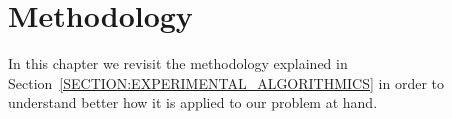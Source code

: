 

\chapter{Methodology}

In this chapter we revisit the methodology explained in Section~\ref{SECTION:EXPERIMENTAL_ALGORITHMICS} in order to understand better how it is applied to our problem at hand.



